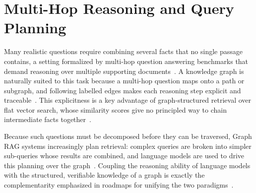 \section{Multi-Hop Reasoning and Query Planning}
\label{sec:gr-multihop}

Many realistic questions require combining several facts that no single passage
contains, a setting formalized by multi-hop question answering benchmarks that
demand reasoning over multiple supporting documents~\cite{yang2018hotpotqa}. A
knowledge graph is naturally suited to this task because a multi-hop question maps
onto a path or subgraph, and following labelled edges makes each reasoning step
explicit and traceable~\cite{peng2024graphrag}. This explicitness is a key
advantage of graph-structured retrieval over flat vector search, whose similarity
scores give no principled way to chain intermediate facts
together~\cite{peng2024graphrag}.

Because such questions must be decomposed before they can be traversed, Graph RAG
systems increasingly plan retrieval: complex queries are broken into simpler
sub-queries whose results are combined, and language models are used to drive this
planning over the graph~\cite{peng2024graphrag}. Coupling the reasoning ability of
language models with the structured, verifiable knowledge of a graph is exactly
the complementarity emphasized in roadmaps for unifying the two
paradigms~\cite{pan2024unifying}.
